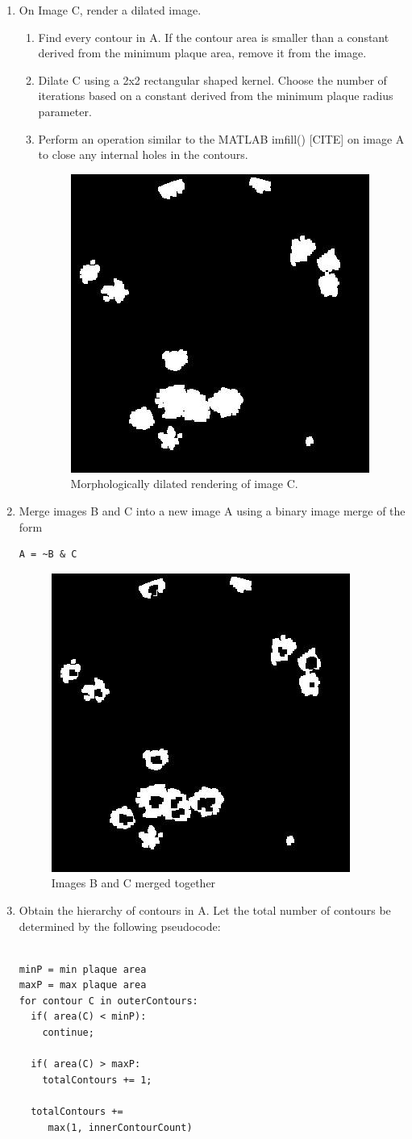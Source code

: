 \documentclass[11pt,final,twocolumn]{IEEEtran}
\begin{document}
\begin{enumerate}
\item On Image C, render a dilated image.
\begin{enumerate}
\item  Find every contour in A. If the contour area is smaller than a constant derived from the minimum plaque area, remove it from the image.
\item  Dilate C using a 2x2 rectangular shaped kernel. Choose the number of iterations based on a constant derived from the minimum plaque radius parameter.
\item  Perform an  operation similar to the MATLAB imfill() [CITE] on image A to close any internal holes in the contours.
\begin{figure}[H]
\centering
\includegraphics[width=.25\textwidth]{countDilateC.jpg}
\caption{Morphologically dilated rendering of image C.}
\label{fig:countDilateC}
\end{figure}
\end{enumerate}

\item
Merge images B and C into a new image A using a binary image merge of the form 
\begin{verbatim}
A = ~B & C
\end{verbatim}
\begin{figure}[H]
\centering
\includegraphics[width=.25\textwidth]{countMerged.jpg}
\caption{Images B and C merged together}
\label{fig:countMerged}
\end{figure}

\item
Obtain the hierarchy of contours in A. Let the total number of contours be determined by the following pseudocode:
\begin{verbatim}

minP = min plaque area
maxP = max plaque area
for contour C in outerContours:
  if( area(C) < minP):
    continue;

  if( area(C) > maxP:
    totalContours += 1;

  totalContours +=
     max(1, innerContourCount) 
\end{verbatim}

\end{enumerate}
\end{document}

